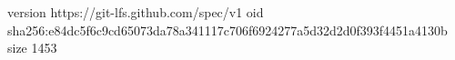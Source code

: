 version https://git-lfs.github.com/spec/v1
oid sha256:e84dc5f6c9cd65073da78a341117c706f6924277a5d32d2d0f393f4451a4130b
size 1453
